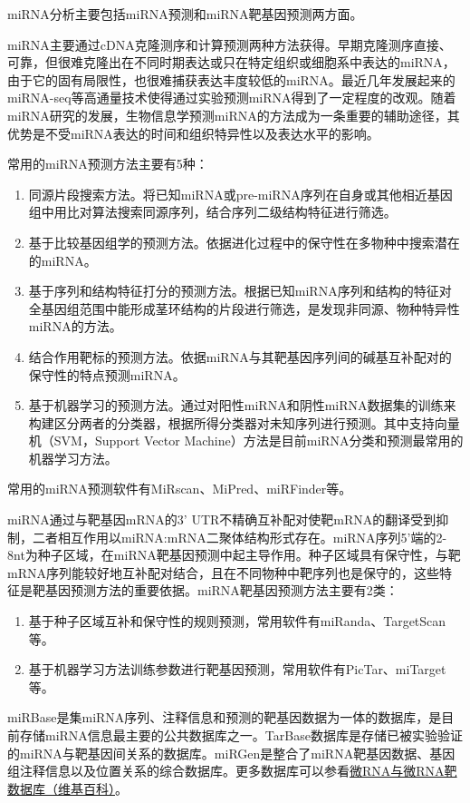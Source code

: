 miRNA分析主要包括miRNA预测和miRNA靶基因预测两方面。

miRNA主要通过cDNA克隆测序和计算预测两种方法获得。早期克隆测序直接、可靠，但很难克隆出在不同时期表达或只在特定组织或细胞系中表达的miRNA，由于它的固有局限性，也很难捕获表达丰度较低的miRNA。最近几年发展起来的miRNA-seq等高通量技术使得通过实验预测miRNA得到了一定程度的改观。随着miRNA研究的发展，生物信息学预测miRNA的方法成为一条重要的辅助途径，其优势是不受miRNA表达的时间和组织特异性以及表达水平的影响。

常用的miRNA预测方法主要有5种：
\begin{enumerate}
	\item 同源片段搜索方法。将已知miRNA或pre-miRNA序列在自身或其他相近基因组中用比对算法搜索同源序列，结合序列二级结构特征进行筛选。
	\item 基于比较基因组学的预测方法。依据进化过程中的保守性在多物种中搜索潜在的miRNA。
	\item 基于序列和结构特征打分的预测方法。根据已知miRNA序列和结构的特征对全基因组范围中能形成茎环结构的片段进行筛选，是发现非同源、物种特异性miRNA的方法。
	\item 结合作用靶标的预测方法。依据miRNA与其靶基因序列间的碱基互补配对的保守性的特点预测miRNA。
	\item 基于机器学习的预测方法。通过对阳性miRNA和阴性miRNA数据集的训练来构建区分两者的分类器，根据所得分类器对未知序列进行预测。其中支持向量机（SVM，Support Vector Machine）方法是目前miRNA分类和预测最常用的机器学习方法。
\end{enumerate}
常用的miRNA预测软件有MiRscan、MiPred、miRFinder等。

miRNA通过与靶基因mRNA的3' UTR不精确互补配对使靶mRNA的翻译受到抑制，二者相互作用以miRNA:mRNA二聚体结构形式存在。miRNA序列5'端的2-8nt为种子区域，在miRNA靶基因预测中起主导作用。种子区域具有保守性，与靶mRNA序列能较好地互补配对结合，且在不同物种中靶序列也是保守的，这些特征是靶基因预测方法的重要依据。miRNA靶基因预测方法主要有2类：
\begin{enumerate}
	\item 基于种子区域互补和保守性的规则预测，常用软件有miRanda、TargetScan等。
	\item 基于机器学习方法训练参数进行靶基因预测，常用软件有PicTar、miTarget等。
\end{enumerate}

miRBase是集miRNA序列、注释信息和预测的靶基因数据为一体的数据库，是目前存储miRNA信息最主要的公共数据库之一。TarBase数据库是存储已被实验验证的miRNA与靶基因间关系的数据库。miRGen是整合了miRNA靶基因数据、基因组注释信息以及位置关系的综合数据库。更多数据库可以参看\href{http://zh.wikipedia.org/wiki/\%E5\%BE\%AERNA\%E4\%B8\%8E\%E5\%BE\%AERNA\%E9\%9D\%B6\%E6\%95\%B0\%E6\%8D\%AE\%E5\%BA\%93}{微RNA与微RNA靶数据库（维基百科）}。

